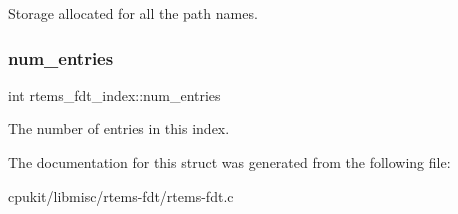 Storage allocated for all the path names. \mbox{\label{structrtems__fdt__index_aab8d87f0d4e15e6d27c984cf8279ad47}} 
\subsubsection{\texorpdfstring{num\_entries}{num\_entries}}
{\footnotesize\ttfamily int rtems\+\_\+fdt\+\_\+index\+::num\+\_\+entries}

The number of entries in this index. 

The documentation for this struct was generated from the following file\+:\begin{DoxyCompactItemize}
\item 
cpukit/libmisc/rtems-\/fdt/rtems-\/fdt.\+c\end{DoxyCompactItemize}
